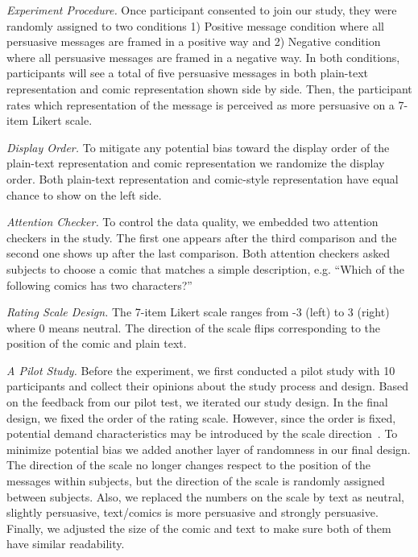 \textit{Experiment Procedure.} Once participant consented to join our study, they were randomly assigned to two conditions 1) Positive message condition where all persuasive messages are framed in a positive way and 2) Negative condition where all persuasive messages are framed in a negative way. In both conditions, participants will see a total of five persuasive messages in both plain-text representation and comic representation shown side by side. Then, the participant rates which representation of the message is perceived as more persuasive on a 7-item Likert scale.

\textit{Display Order.} To mitigate any potential bias toward the display order of the plain-text representation and comic representation we randomize the display order. Both plain-text representation and comic-style representation have equal chance to show on the left side.

\textit{Attention Checker.} To control the data quality, we embedded two attention checkers in the study. The first one appears after the third comparison and the second one shows up after the last comparison. Both attention checkers asked subjects to choose a comic that matches a simple description, e.g. ``Which of the following comics has two characters?''

\textit{Rating Scale Design.} The 7-item Likert scale ranges from -3 (left) to 3 (right) where 0 means neutral. The direction of the scale flips corresponding to the position of the comic and plain text.

\textit{A Pilot Study.} Before the experiment, we first conducted a pilot study with 10 participants and collect their opinions about the study process and design. Based on the feedback from our pilot test, we iterated our study design. In the final design, we fixed the order of the rating scale. However, since the order is fixed, potential demand characteristics may be introduced by the scale direction~\cite{orne1962social}. To minimize potential bias we added another layer of randomness in our final design. The direction of the scale no longer changes respect to the position of the messages within subjects, but the direction of the scale is randomly assigned between subjects. Also, we replaced the numbers on the scale by text as neutral, slightly persuasive, text/comics is more persuasive and strongly persuasive. Finally, we adjusted the size of the comic and text to make sure both of them have similar readability.
%

